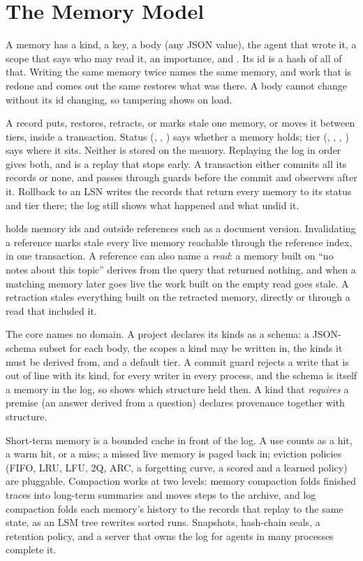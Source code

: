 \section{The Memory Model}
\label{sec:model}

A memory has a kind, a key, a body (any JSON value), the agent that wrote it, a
scope that says who may read it, an importance, and . Its id
is a hash of all of that. Writing the same memory twice names the same memory,
and work that is redone and comes out the same restores what was there. A body
cannot change without its id changing, so tampering shows on load.

A record puts, restores, retracts, or marks stale one memory, or moves it between
tiers, inside a transaction. Status (, , )
says whether a memory holds; tier (, , ,
) says where it sits. Neither is stored on the memory. Replaying the
log in order gives both, and  is a replay that stops early. A
transaction either commits all its records or none, and passes through guards
before the commit and observers after it. Rollback to an LSN writes the records
that return every memory to its status and tier there; the log still shows what
happened and what undid it.

 holds memory ids and outside references such as a document
version. Invalidating a reference marks stale every live memory reachable
through the reference index, in one transaction. A reference can also name a
\emph{read}: a memory built on ``no notes about this topic'' derives from the
query that returned nothing, and when a matching memory later goes live the work
built on the empty read goes stale. A retraction stales everything built on the
retracted memory, directly or through a read that included it.

The core names no domain. A project declares its kinds as a schema: a JSON-schema
subset for each body, the scopes a kind may be written in, the kinds it must be
derived from, and a default tier. A commit guard rejects a write that is out of
line with its kind, for every writer in every process, and the schema is itself a
memory in the log, so  shows which structure held then. A kind
that \emph{requires} a premise (an answer derived from a question) declares
provenance together with structure.

Short-term memory is a bounded cache in front of the log. A use counts as a hit,
a warm hit, or a miss; a missed live memory is paged back in; eviction policies
(FIFO, LRU, LFU, 2Q, ARC, a forgetting curve, a scored and a learned policy) are
pluggable. Compaction works at two levels: memory compaction folds finished
traces into long-term summaries and moves steps to the archive, and log
compaction folds each memory's history to the records that replay to the same
state, as an LSM tree rewrites sorted runs. Snapshots, hash-chain seals, a
retention policy, and a server that owns the log for agents in many processes
complete it.
